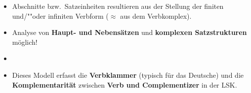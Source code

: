 \begin{frame}

\begin{itemize}
	\item Abschnitte bzw.\ Satzeinheiten resultieren aus der Stellung der finiten und/""oder infiniten Verbform ($\approx$ aus dem Verbkomplex).
\end{itemize}

\begin{table}
\centering
{}
\end{table}

\end{frame}


\begin{frame}

\begin{itemize}
	\item Analyse von \textbf{Haupt- und Nebensätzen} und \textbf{komplexen Satzstrukturen} möglich!
	\item[]
	\item Dieses Modell erfasst die \textbf{Verbklammer} (typisch für das Deutsche) und
	die \textbf{Komplementarität} zwischen \textbf{Verb und Complementizer} in der LSK.
\end{itemize}

\begin{table}
\centering
{}
\end{table}

\end{frame}



